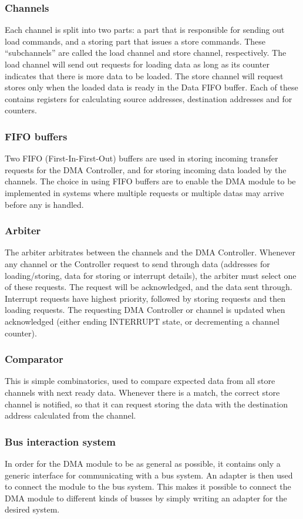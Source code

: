 \subsubsection{Channels}
Each channel is split into two parts: a part that is responsible for sending out load
commands, and a storing part that issues a store commands. These ``subchannels''
are called the load channel and store channel, respectively.
The load channel will send out requests for loading data as long as its counter indicates that there is more data to be loaded. The store channel will request stores only when the loaded data is ready in the Data FIFO buffer.
Each of these contains registers for calculating source addresses, destination addresses and for counters.

\subsubsection{FIFO buffers}
Two FIFO (First-In-First-Out) buffers are used in storing incoming transfer requests for the DMA Controller, and for storing incoming data loaded by the channels.
The choice in using FIFO buffers are to enable the DMA module to be implemented in systems where multiple requests or multiple datas may arrive before any is handled.

\subsubsection{Arbiter}
The arbiter arbitrates between the channels and the DMA Controller.
Whenever any channel or the Controller request to send through data (addresses for loading/storing, data for storing or interrupt details), the arbiter must select one of these requests.
The request will be acknowledged, and the data sent through.
Interrupt requests have highest priority, followed by storing requests and then loading requests.
The requesting DMA Controller or channel is updated when acknowledged (either ending INTERRUPT state, or decrementing a channel counter).

\subsubsection{Comparator}
This is simple combinatorics, used to compare expected data from all store channels with next ready data.
Whenever there is a match, the correct store channel is notified, so that it can request storing the data with the destination address calculated from the channel.

\subsubsection{Bus interaction system}
In order for the DMA module to be as general as possible, it contains only a generic
interface for communicating with a bus system. An adapter is then used to connect
the module to the bus system. This makes it possible to connect the DMA module to
different kinds of busses by simply writing an adapter for the desired system.


